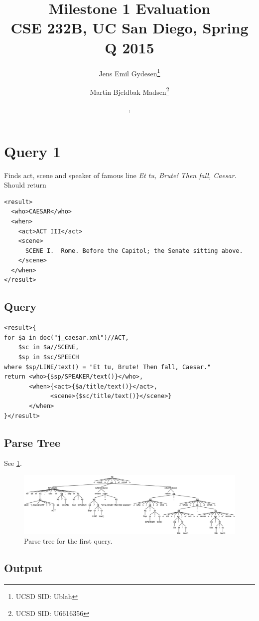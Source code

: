 \documentclass{article}
\title{Milestone 1 Evaluation\\
{\small CSE 232B, UC San Diego, Spring Q 2015}}
\author{Jens Emil Gydesen\thanks{UCSD SID: Ublah} \and
        Martin Bjeldbak Madsen\thanks{UCSD SID: U6616356}}
\date{\DTMdisplaydate{2015}{5}{13}{3}, \DTMdisplaytime{11}{10}{00}}
\begin{document}
\maketitle

\section{Query 1}
Finds act, scene and speaker of famous line \emph{Et tu, Brute! Then fall, Caesar}. Should return 

\begin{verbatim}
<result>
  <who>CAESAR</who>
  <when>
    <act>ACT III</act>
    <scene>
      SCENE I.  Rome. Before the Capitol; the Senate sitting above.
    </scene>
  </when>
</result>
\end{verbatim}

\subsection{Query}
\begin{verbatim}
<result>{
for $a in doc("j_caesar.xml")//ACT,
    $sc in $a//SCENE,
    $sp in $sc/SPEECH
where $sp/LINE/text() = "Et tu, Brute! Then fall, Caesar."
return <who>{$sp/SPEAKER/text()}</who>,
       <when>{<act>{$a/title/text()}</act>,
             <scene>{$sc/title/text()}</scene>}
       </when>
}</result>
\end{verbatim}

\subsection{Parse Tree}
See \cref{fig:parseTree1}.
\begin{figure}[htpb]
  \centering
  \includegraphics[width=\linewidth]{imgs/antlr4_parse_tree_query_1.png}
  \caption{Parse tree for the first query.}\label{fig:parseTree1}
\end{figure}

\subsection{Output}
\end{document}
